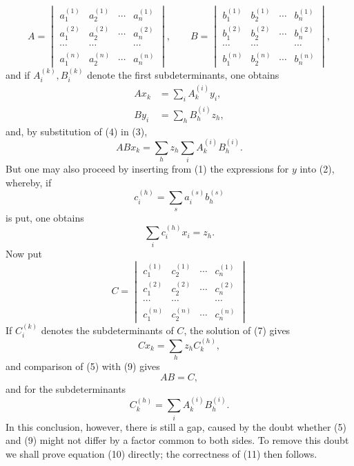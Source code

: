
\[
A=\begin{vmatrix}
 a_1^{(1)}&a_2^{(1)}&\cdots&a_n^{(1)}\\
 a_1^{(2)}&a_2^{(2)}&\cdots&a_n^{(2)}\\
 \cdots&\cdots&&\cdots\\
 a_1^{(n)}&a_2^{(n)}&\cdots&a_n^{(n)}
\end{vmatrix},\qquad
B=\begin{vmatrix}
 b_1^{(1)}&b_2^{(1)}&\cdots&b_n^{(1)}\\
 b_1^{(2)}&b_2^{(2)}&\cdots&b_n^{(2)}\\
 \cdots&\cdots&&\cdots\\
 b_1^{(n)}&b_2^{(n)}&\cdots&b_n^{(n)}
\end{vmatrix},
\]
and if $A_i^{(k)},B_i^{(k)}$ denote the first subdeterminants, one obtains
\begin{align}
 A x_k&=\sum_i A_k^{(i)}y_i,\tag{3}\\
 B y_i&=\sum_h B_h^{(i)}z_h,\tag{4}
\end{align}
and, by substitution of (4) in (3),
\begin{equation}
 ABx_k=\sum_h z_h\sum_i A_k^{(i)}B_h^{(i)}.\tag{5}
\end{equation}
But one may also proceed by inserting from (1) the expressions for $y$ into (2), whereby, if
\begin{equation}
 c_i^{(h)}=\sum_s a_i^{(s)}b_h^{(s)}\tag{6}
\end{equation}
is put, one obtains
\begin{equation}
 \sum_i c_i^{(h)}x_i=z_h.\tag{7}
\end{equation}
Now put
\[
C=\begin{vmatrix}
 c_1^{(1)}&c_2^{(1)}&\cdots&c_n^{(1)}\\
 c_1^{(2)}&c_2^{(2)}&\cdots&c_n^{(2)}\\
 \cdots&\cdots&&\cdots\\
 c_1^{(n)}&c_2^{(n)}&\cdots&c_n^{(n)}
\end{vmatrix}\tag{8}
\]
If $C_i^{(k)}$ denotes the subdeterminants of $C$, the solution of (7) gives
\begin{equation}
 Cx_k=\sum_h z_h C_k^{(h)},\tag{9}
\end{equation}
and comparison of (5) with (9) gives
\begin{equation}
 AB=C,\tag{10}
\end{equation}
and for the subdeterminants
\begin{equation}
 C_k^{(h)}=\sum_i A_k^{(i)}B_h^{(i)}.\tag{11}
\end{equation}
In this conclusion, however, there is still a gap, caused by the doubt whether (5) and (9) might not differ by a factor common to both sides. To remove this doubt we shall prove equation (10) directly; the correctness of (11) then follows.
